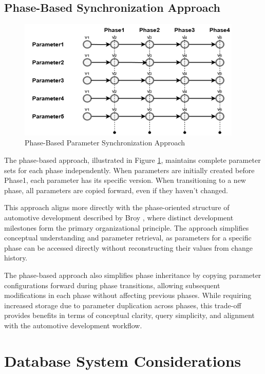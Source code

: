 \subsection{Phase-Based Synchronization Approach}
\label{subsec:phase-based-sync}

\begin{figure}[h]
    \centering
    \includegraphics[width=0.95\textwidth]{figures/phase_based_approach.png}
    \caption{Phase-Based Parameter Synchronization Approach}
    \label{fig:phase-based-sync}
\end{figure}

The phase-based approach, illustrated in Figure \ref{fig:phase-based-sync}, maintains complete parameter sets for each phase independently. When parameters are initially created before Phase1, each parameter has its specific version. When transitioning to a new phase, all parameters are copied forward, even if they haven't changed.

This approach aligns more directly with the phase-oriented structure of automotive development described by Broy \cite{broy2006challenges}, where distinct development milestones form the primary organizational principle. The approach simplifies conceptual understanding and parameter retrieval, as parameters for a specific phase can be accessed directly without reconstructing their values from change history.

The phase-based approach also simplifies phase inheritance by copying parameter configurations forward during phase transitions, allowing subsequent modifications in each phase without affecting previous phases. While requiring increased storage due to parameter duplication across phases, this trade-off provides benefits in terms of conceptual clarity, query simplicity, and alignment with the automotive development workflow.

\section{Database System Considerations}
\label{sec:database-system-considerations}


